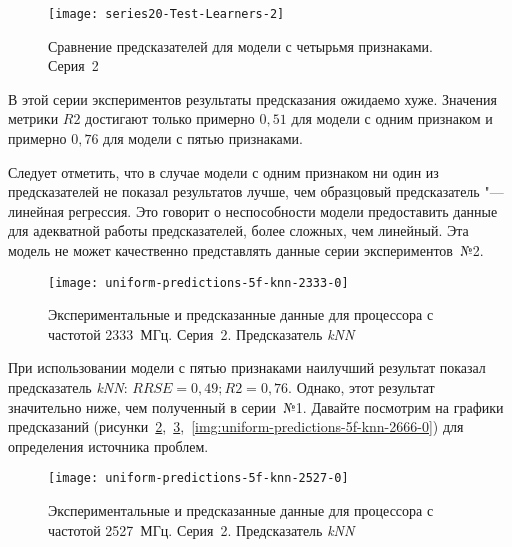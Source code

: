 \begin{figure}
    \begin{center}
            \texttt{[image: series20-Test-Learners-2]}
            \caption{Сравнение предсказателей для модели с четырьмя признаками. Серия~2}
            \label{img:series20-Test-Learners-2}
    \end{center}
\end{figure}

В этой серии экспериментов результаты предсказания ожидаемо хуже. Значения метрики $R2$ достигают только примерно $0,51$ для модели с одним признаком и примерно $0,76$ для модели с пятью признаками.

Следует отметить, что в случае модели с одним признаком ни один из предсказателей не показал результатов лучше, чем образцовый предсказатель "--- линейная регрессия. Это говорит о неспособности модели предоставить данные для адекватной работы предсказателей, более сложных, чем линейный. Эта модель не может качественно представлять данные серии экспериментов~№2.

\begin{figure}
    \begin{center}
        \texttt{[image: uniform-predictions-5f-knn-2333-0]}
        \caption{Экспериментальные и предсказанные данные для процессора с частотой 2333~МГц. Серия~2. Предсказатель \textit{kNN}}
        \label{img:uniform-predictions-5f-knn-2333-0}
    \end{center}
\end{figure}

При использовании модели с пятью признаками наилучший результат показал предсказатель \textit{kNN}: $RRSE = 0,49; R2 = 0,76$. Однако, этот результат значительно ниже, чем полученный в серии~№1. Давайте посмотрим на графики предсказаний (рисунки~\ref{img:uniform-predictions-5f-knn-2333-0},~\ref{img:uniform-predictions-5f-knn-2527-0},~\ref{img:uniform-predictions-5f-knn-2666-0}) для определения источника проблем.

\begin{figure}
    \begin{center}
        \texttt{[image: uniform-predictions-5f-knn-2527-0]}
        \caption{Экспериментальные и предсказанные данные для процессора с частотой 2527~МГц. Серия~2. Предсказатель \textit{kNN}}
        \label{img:uniform-predictions-5f-knn-2527-0}
    \end{center}
\end{figure}

